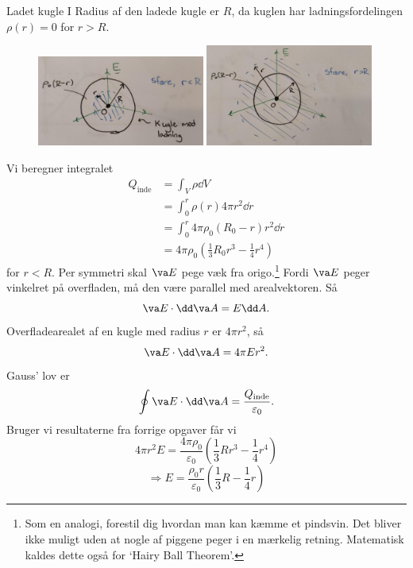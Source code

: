 \begin{opgave}{Ladet kugle I}
    \opg Radius af den ladede kugle er $R$, da kuglen har ladningsfordelingen $\rho(r) = 0$ for $r > R$.
    \opg 
    \begin{figure}[H]
        \centering
        \includegraphics[width=0.49\textwidth]{facit/figurer/elektro/elektro_opg7,2(1).jpg}
        \includegraphics[width=0.49\textwidth]{facit/figurer/elektro/elektro_opg7,2(2).jpg}
    \end{figure}
    \opg Vi beregner integralet
    \begin{align*}
        Q_\text{inde}&=\int_V\rho\dd V\\
        &=\int_0^r\rho(r)4\pi r^2\dd r\\
        &=\int_0^r 4\pi\rho_0(R_0-r)r^2\dd r\\
        &=4\pi\rho_0\left(\frac{1}{3}R_0r^3-\frac{1}{4}r^4\right)
    \end{align*}
    for $r<R$.
    \opg Per symmetri skal $\va E$ pege væk fra origo.\footnote{Som en analogi, forestil dig hvordan man kan kæmme et pindsvin. Det bliver ikke muligt uden at nogle af piggene peger i en mærkelig retning. Matematisk kaldes dette også for `Hairy Ball Theorem'.}
    \opg Fordi $\va E$ peger vinkelret på overfladen, må den være parallel med arealvektoren. Så
    \[ \va E\cdot \dd\va A=E\dd A. \]
    Overfladearealet af en kugle med radius $r$ er $4\pi r^2$, så
    \[ \va E\cdot \dd\va A=4\pi Er^2. \]
    \opg Gauss' lov er
    \[ \oint \va E\cdot \dd \va A=\frac{Q_\text{inde}}{\varepsilon_0}. \]
    Bruger vi resultaterne fra forrige opgaver får vi
    \[ 4\pi r^2 E=\frac{4\pi\rho_0}{\varepsilon_0}\left(\frac{1}{3}Rr^3-\frac{1}{4}r^4\right) \]
    \[ \Rightarrow E=\frac{\rho_0 r}{\varepsilon_0}\left(\frac{1}{3}R-\frac{1}{4}r\right) \]

\end{opgave}

